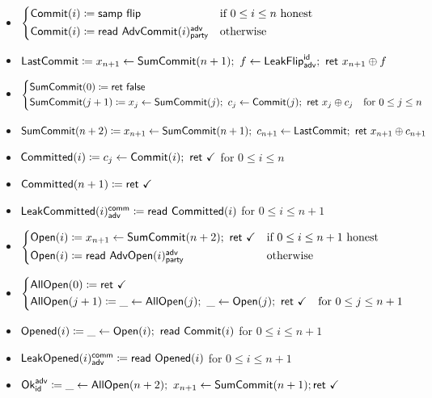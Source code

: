 \begin{itemize}
\item {\color{blue} $\begin{cases*} \Commit(i) \coloneqq \samp{\flip} & \text{if $0 \leq i \leq n$ honest} \\ \Commit(i) \coloneqq \read{\AdvCommit(i)^\adv_\party} & \text{otherwise} \end{cases*}$}
\item {\color{blue} $\LastCommit \coloneqq x_{n+1} \leftarrow \SumCommit(n+1); \ f \leftarrow \LeakFlip^\id_\adv; \ \ret{x_{n+1} \oplus f}$}
\item {\color{blue} $\begin{cases*} \SumCommit(0) \coloneqq \ret{\false} & \\ \SumCommit(j+1) \coloneqq x_j \leftarrow \SumCommit(j); \ c_j \leftarrow \Commit(j); \ \ret{x_j \oplus c_j} & \text{for $0 \leq j \leq n$} \end{cases*}$}
\item {\color{blue} $\SumCommit(n+2) \coloneqq x_{n+1} \leftarrow \SumCommit(n+1); \ c_{n+1} \leftarrow \LastCommit; \ \ret{x_{n+1} \oplus c_{n+1}}$}
\item {\color{magenta} $\mathsf{Committed}(i) \coloneqq c_j \leftarrow \mathsf{Commit}(i); \ \mathsf{ret} \ \checkmark$ for $0 \leq i \leq n$}
\item {\color{magenta} $\mathsf{Committed}(n+1) \coloneqq \mathsf{ret} \ \checkmark$}
\item {\color{magenta} $\mathsf{LeakCommitted}(i)^{\mathsf{comm}}_{\mathsf{adv}} \coloneqq \mathsf{read} \ \mathsf{Committed}(i)$ for $0 \leq i \leq n+1$}
\item {\color{teal} $\begin{cases*} \Open(i) \coloneqq x_{n+1} \leftarrow \SumCommit(n+2); \ \ret{\checkmark} & \text{if $0 \leq i \leq n+1$ honest} \\ \Open(i) \coloneqq \read{\AdvOpen(i)^\adv_\party} & \text{otherwise} \end{cases*}$}
\item {\color{teal} $\begin{cases*} \AllOpen(0) \coloneqq \ret{\checkmark} & \\ \AllOpen(j+1) \coloneqq \_ \leftarrow \AllOpen(j); \ \_ \leftarrow \Open(j); \ \ret{\checkmark} & \text{for $0 \leq j \leq n+1$} \end{cases*}$}
\item {\color{red} $\mathsf{Opened}(i) \coloneqq \_ \leftarrow \mathsf{Open}(i); \ \mathsf{read} \ \mathsf{Commit}(i)$ for $0 \leq i \leq n+1$}
\item {\color{red} $\mathsf{LeakOpened}(i)^{\mathsf{comm}}_{\mathsf{adv}} \coloneqq \mathsf{read} \ \mathsf{Opened}(i)$ for $0 \leq i \leq n+1$}
\item $\mathsf{Ok}^{\mathsf{adv}}_{\mathsf{id}} \coloneqq \_ \leftarrow \mathsf{AllOpen}(n+2); \ x_{n+1} \leftarrow \mathsf{SumCommit}(n+1); \mathsf{ret} \ \checkmark$
\end{itemize}

